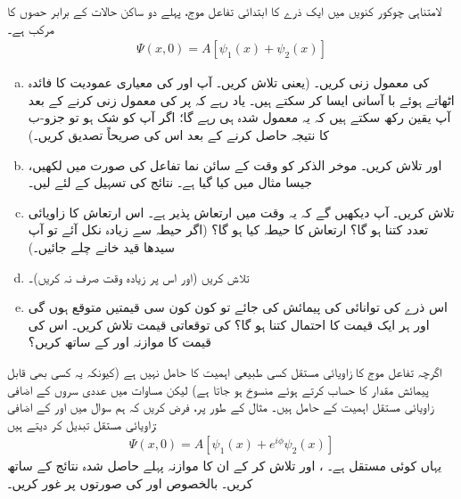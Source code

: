 لامتناہی چوکور کنویں  میں ایک ذرے کا ابتدائی تفاعل موج،   پہلے  دو ساکن  حالات  کے برابر  حصوں کا مرکب ہے۔ 
\begin{align*}
\Psi(x,0) = A[\psi_{1}(x) + \psi_{2}(x)]
\end{align*}
\begin{enumerate}[a.]
\item 
{} کی  معمول زنی کریں۔ (یعنی  تلاش کریں۔ آپ  اور  کی معیاری عمودیت  کا فائدہ اٹھاتے  ہوئے با آسانی ایسا کر سکتے ہیں۔ یاد رہے کہ  پر  کی معمول زنی کرنے  کے بعد آپ یقین رکھ سکتے ہیں کہ یہ معمول شدہ ہی رہے گا؛  اگر آپ کو شک ہو تو  جزو-ب کا نتیجہ حاصل کرنے کے بعد اس کی صریحاً تصدیق کریں۔) 
\item
{} اور  تلاش کریں۔ موخر الذکر کو وقت کے سائن نما تفاعل کی صورت میں لکھیں، جیسا مثال  میں کیا گیا ہے۔ نتائج کی  تسہیل  کے لئے   لیں۔ 
\item 
{} تلاش کریں۔ آپ دیکھیں گے کہ یہ وقت میں  ارتعاش  پذیر  ہے۔ اس ارتعاش کا  زاویائی تعدد کتنا ہو گا؟ ارتعاش کا حیطہ کیا ہو گا؟ (اگر  حیطہ  سے زیادہ نکل آئے تو  آپ  سیدھا    قید خانے  چلے جائیں۔) 
\item 
{} تلاش کریں (اور اس پر  زیادہ وقت صرف نہ کریں)۔ 
\item
اس ذرے کی توانائی کی پیمائش کی جائے  تو  کون کون سی قیمتیں متوقع ہوں گی اور ہر ایک قیمت کا احتمال کتنا ہو گا؟  کی توقعاتی قیمت تلاش کریں۔ اس کی قیمت کا موازنہ  اور  کے ساتھ کریں؟
\end{enumerate}
اگرچہ تفاعل موج کا   زاویائی مستقل کسی  طبیعی اہمیت کا حامل نہیں ہے (کیونکہ یہ کسی بھی قابل پیمائش مقدار کا حساب کرتے ہوئے منسوخ ہو جاتا ہے) لیکن مساوات  میں عددی سروں کے اضافی زاویائی مستقل اہمیت کے حامل ہیں۔ مثال کے طور پر، فرض کریں کہ  ہم سوال  میں  اور  کے اضافی زاویائی مستقل تبدیل کر دیتے  ہیں:
\begin{align*}
\Psi (x,0) = A[\psi_{1} (x) + e^{i\phi}\psi_{2}(x)]
\end{align*}
یہاں  کوئی مستقل ہے۔ ،  اور  تلاش کر کے ان کا موازنہ پہلے حاصل شدہ نتائج کے ساتھ کریں۔ بالخصوص  اور  کی صورتوں پر غور کریں۔ 
